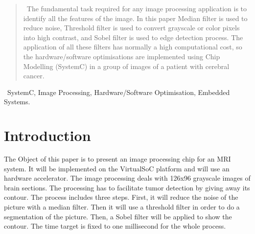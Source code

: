 \documentclass[journal]{IEEEtran}
\begin{document}
\begin{abstract}
~The fundamental task required for any image processing application is to identify all the features of the image. In this paper Median filter is used to reduce noise, Threshold filter is used to convert grayscale or color pixels into high contrast, and Sobel filter is used to edge detection process. The application of all these filters has normally a high computational cost, so the hardware/software optimisations are implemented using Chip Modelling (SystemC) in a group of images of a patient with cerebral cancer.

\end{abstract}

\begin{IEEEkeywords}

~SystemC, Image Processing, Hardware/Software Optimisation, Embedded Systems.

\end{IEEEkeywords}






%
\IEEEpeerreviewmaketitle



\section{Introduction}
The Object of this paper is to present an image processing chip for an MRI system. It will be implemented on the VirtualSoC platform and will use an hardware accelerator. The image processing deals with 126x96 grayscale images of brain sections. The processing has to facilitate tumor detection by giving away its contour. The process includes three steps. First, it will reduce the noise of the picture with a median filter. Then it will use a threshold filter in order to do a segmentation of the picture. Then, a Sobel filter will be applied to show the contour. The time target is fixed to one millisecond for the whole process.
\end{document}
